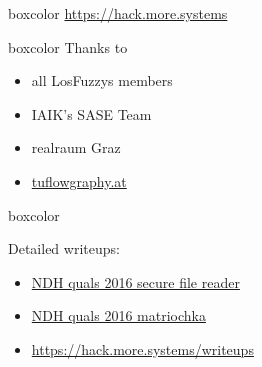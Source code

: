 {
\begin{frame}[plain]



  \begin{center}
  	\begin{beamercolorbox}[sep=0.5em,wd=10cm]{boxcolor}
	    \color{white}
	    {\huge \url{https://hack.more.systems}}
	\end{beamercolorbox}
  \end{center}

  \vspace{3em}


  \begin{beamercolorbox}[sep=1em,wd=5cm]{boxcolor}
    Thanks to

    \begin{itemize}
      \item all LosFuzzys members
      \item IAIK's SASE Team
      \item realraum Graz
      \item \url{tuflowgraphy.at}
    \end{itemize}


  \end{beamercolorbox}

\end{frame}


\begin{frame}[plain]
	
	\begin{beamercolorbox}[sep=1em,wd=7cm]{boxcolor}
		
		Detailed writeups:
		
		{\footnotesize
		  \begin{itemize}
		    \item \href{https://losfuzzys.github.io/writeup/2016/04/04/ndhquals2016-secure-file-reader/}
		      {NDH quals 2016 secure file reader}
		    \item \href{https://losfuzzys.github.io/writeup/2016/04/04/ndhquals2016-matriochka/}
		      {NDH quals 2016 matriochka}
		     \item \url{https://hack.more.systems/writeups}
		  \end{itemize}
		}
	\end{beamercolorbox}
	
\end{frame}
}
